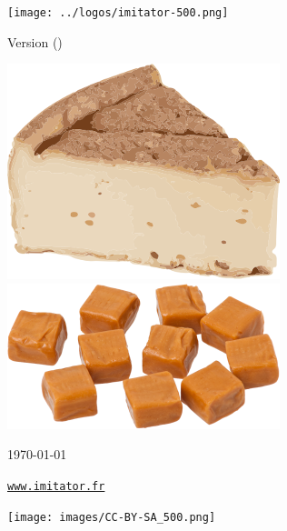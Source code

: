 
\thispagestyle{empty}

\mbox{}

\vspace{1cm}

\begin{center}
	{\Huge \bfseries \titleOnFirstPage{}}

	\vspace{2cm}

	\texttt{[image: ../logos/imitator-500.png]}

	\vspace{2.5cm}
	
	{\Large Version \imitatorversion{} (\imitatorversionname{})}
	
	\medskip
	
	\includegraphics[height=0.15\textwidth]{../logos/logo-3-300.png}
	\hspace{2em}
	\includegraphics[height=0.15\textwidth]{../logos/logo-3-3-300.png}

\end{center}

\vspace{1.5cm}

{\small \hfill{}\today{}}

\vspace{2cm}

\begin{center}
 	{\Large \href{https://www.imitator.fr/}{\nolinkurl{www.imitator.fr}}}
 	
\end{center}
\hfill\texttt{[image: images/CC-BY-SA\_500.png]}




\newpage

\tableofcontents
{}

\newpage
